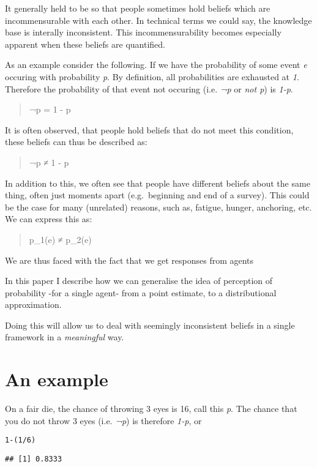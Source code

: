 \documentclass[a4paper]{book}\usepackage{graphicx, color}
\makeatletter
\newenvironment{kframe}{%
 \def\at@end@of@kframe{}%
 \ifinner\ifhmode%
  \def\at@end@of@kframe{\end{minipage}}%
  \begin{minipage}{\columnwidth}%
 \fi\fi%
 \def\FrameCommand##1{\hskip\@totalleftmargin \hskip-\fboxsep
 \colorbox{shadecolor}{##1}\hskip-\fboxsep
     \hskip-\linewidth \hskip-\@totalleftmargin \hskip\columnwidth}%
 \MakeFramed {\advance\hsize-\width
   \@totalleftmargin\z@ \linewidth\hsize
   \@setminipage}}%
 {\par\unskip\endMakeFramed%
 \at@end@of@kframe}
\newenvironment{knitrout}{}{} %
\makeatother
\begin{document}
It generally held to be so that people sometimes hold beliefs which are
incommensurable with each other. In technical terms we could say, the
knowledge base is interally inconsistent. This incommensurability
becomes especially apparent when these beliefs are quantified.

As an example consider the following. If we have the probability of some
event \emph{e} occuring with probability \emph{p}. By definition, all
probabilities are exhausted at \emph{1}. Therefore the probability of
that event not occuring (i.e. \emph{¬p} or \emph{not p}) is \emph{1-p}.

\begin{quote}
¬p = 1 - p
\end{quote}

It is often observed, that people hold beliefs that do not meet this
condition, these beliefs can thus be described as:

\begin{quote}
¬p ≠ 1 - p
\end{quote}

In addition to this, we often see that people have different beliefs
about the same thing, often just moments apart (e.g.~beginning and end
of a survey). This could be the case for many (unrelated) reasons, such
as, fatigue, hunger, anchoring, etc. We can express this as:

\begin{quote}
p\_1(e) ≠ p\_2(e)
\end{quote}

We are thus faced with the fact that we get responses from agents

In this paper I describe how we can generalise the idea of perception of
probability -for a single agent- from a point estimate, to a
distributional approximation.

Doing this will allow us to deal with seemingly inconsistent beliefs in
a single framework in a \emph{meaningful} way.

\section{An example}

On a fair die, the chance of throwing 3 eyes is 16, call this \emph{p}.
The chance that you do not throw 3 eyes (i.e. \emph{¬p}) is therefore
\emph{1-p}, or

\begin{knitrout}
\color{fgcolor}\begin{kframe}
\begin{alltt}
1 - (1/6)
\end{alltt}
\begin{verbatim}
## [1] 0.8333
\end{verbatim}
\end{kframe}
\end{knitrout}
\end{document}
